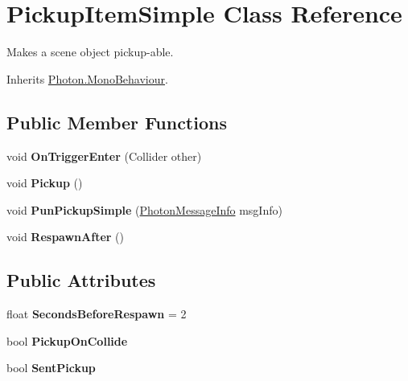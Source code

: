 \hypertarget{class_pickup_item_simple}{}\section{Pickup\+Item\+Simple Class Reference}
\label{class_pickup_item_simple}


Makes a scene object pickup-\/able.  




Inherits \hyperlink{class_photon_1_1_mono_behaviour}{Photon.\+Mono\+Behaviour}.

\subsection*{Public Member Functions}
\begin{DoxyCompactItemize}
\item 
void {\bfseries On\+Trigger\+Enter} (Collider other)\hypertarget{class_pickup_item_simple_a881d6f64f61dec99bef0c5a473efb614}{}\label{class_pickup_item_simple_a881d6f64f61dec99bef0c5a473efb614}

\item 
void {\bfseries Pickup} ()\hypertarget{class_pickup_item_simple_af3b7fe505e0a4e7ecd587bad9051a0b8}{}\label{class_pickup_item_simple_af3b7fe505e0a4e7ecd587bad9051a0b8}

\item 
void {\bfseries Pun\+Pickup\+Simple} (\hyperlink{class_photon_message_info}{Photon\+Message\+Info} msg\+Info)\hypertarget{class_pickup_item_simple_afab04ad30638068aaf6676f00aa8645c}{}\label{class_pickup_item_simple_afab04ad30638068aaf6676f00aa8645c}

\item 
void {\bfseries Respawn\+After} ()\hypertarget{class_pickup_item_simple_a54b4d90b309c5abbecbbf65f9d792bab}{}\label{class_pickup_item_simple_a54b4d90b309c5abbecbbf65f9d792bab}

\end{DoxyCompactItemize}
\subsection*{Public Attributes}
\begin{DoxyCompactItemize}
\item 
float {\bfseries Seconds\+Before\+Respawn} = 2\hypertarget{class_pickup_item_simple_a0c8ca814aca61995c81df3cdc2bc7a3e}{}\label{class_pickup_item_simple_a0c8ca814aca61995c81df3cdc2bc7a3e}

\item 
bool {\bfseries Pickup\+On\+Collide}\hypertarget{class_pickup_item_simple_a733517ea66dbf144dc07a36b56aa8f83}{}\label{class_pickup_item_simple_a733517ea66dbf144dc07a36b56aa8f83}

\item 
bool {\bfseries Sent\+Pickup}\hypertarget{class_pickup_item_simple_a3b0327f9a9c6e4ed9f79e492e2959759}{}\label{class_pickup_item_simple_a3b0327f9a9c6e4ed9f79e492e2959759}

\end{DoxyCompactItemize}
